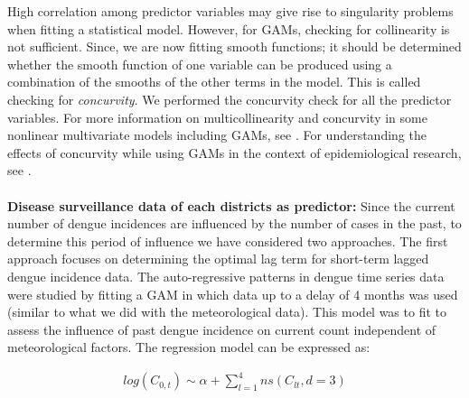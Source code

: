 \documentclass{bmcart}
\begin{document}
High correlation among predictor variables may give rise to singularity problems when fitting a statistical model. However, for GAMs, checking for collinearity is not sufficient. Since, we are now fitting smooth functions; it should be determined whether the smooth function of one variable can be produced using a combination of the smooths of the other terms in the model. This is called checking for \textit{concurvity}. We performed the concurvity check for all the predictor variables. For more information on multicollinearity and concurvity in some nonlinear multivariate models including GAMs, see \cite{morlini2006multicollinearity}. For understanding the effects of concurvity while using GAMs in the context of epidemiological research, see \cite{ramsay2003effect, neuberger2004acute}. \\ \\
\textbf{Disease surveillance data of each districts as predictor:} Since the current number of dengue incidences are influenced by the number of cases in the past, to determine this period of influence we have considered two approaches. The first approach focuses on determining the optimal lag term for short-term lagged dengue incidence data. The auto-regressive patterns in dengue time series data were studied by fitting a GAM in which data up to a delay of 4 months was used (similar to what we did with the meteorological data). This model was to fit to assess the influence of past dengue incidence on current count independent of meteorological factors. The regression model can be expressed as:

\begin{equation}
\begin{aligned}
\label{eq:short}
log (C_{0,t}) \sim \alpha + \sum_{l=1}^{4} ns(C_ {lt}, d =3) 
\end{aligned}
\end{equation}
\end{document}
